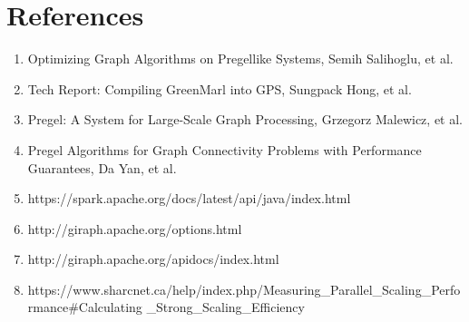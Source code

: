 \documentclass[11pt,a4paper,oneside]{article}
\begin{document}
        
    \section{References}
    \begin{enumerate}{}{}
    	\item Optimizing Graph Algorithms on Pregellike Systems, Semih Salihoglu, et al.
    	\item Tech Report: Compiling GreenMarl into GPS, Sungpack Hong, et al.
    	\item Pregel: A System for Large-Scale Graph Processing, Grzegorz Malewicz, et al.
    	\item Pregel Algorithms for Graph Connectivity Problems with Performance Guarantees, Da Yan, et al.
    	\item https://spark.apache.org/docs/latest/api/java/index.html
    	\item http://giraph.apache.org/options.html
    	\item http://giraph.apache.org/apidocs/index.html
    	\item https://www.sharcnet.ca/help/index.php/Measuring\_Parallel\_Scaling\_Performance\#Calculating
    	      \_Strong\_Scaling\_Efficiency
    \end{enumerate}  
    
\end{document}
